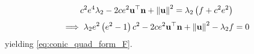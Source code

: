 \begin{align}
c^2e^4\lambda_2-2ce^2\mathbf{u}^{\top}\mathbf{n}+\left\lVert\mathbf{u}\right\rVert^2 = \lambda_2\left(f+c^2e^2\right)
\end{align}
\begin{align}
\implies \lambda_2e^2\left(e^2-1\right)c^2-2ce^2\mathbf{u}^{\top}\mathbf{n}
	+\left\lVert\mathbf{u}\right\rVert^2 - \lambda_2 f = 0
\end{align}
yielding
  \eqref{eq:conic_quad_form_F}. 

